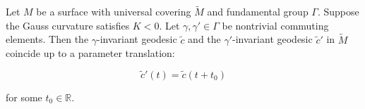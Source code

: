 Let $M$ be a surface with universal covering $\tilde{M}$ and fundamental group $\Gamma$. Suppose the Gauss curvature satisfies $K < 0$. Let $\gamma, \gamma' \in \Gamma$ be nontrivial commuting elements. Then the $\gamma$-invariant geodesic $\tilde{c}$ and the $\gamma'$-invariant geodesic $\tilde{c}'$ in $\tilde{M}$ coincide up to a parameter translation:

$$\tilde{c}'(t) = \tilde{c}(t + t_0)$$

for some $t_0 \in \mathbb{R}$.
